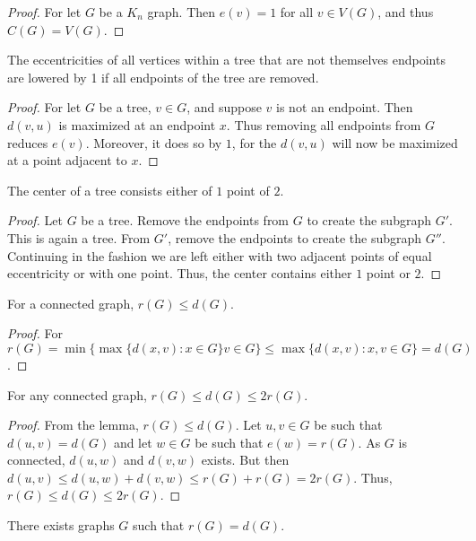 \documentclass[crop=false,class=book,oneside]{standalone}
\begin{document}
        \begin{proof}
        For let $G$ be a $K_n$ graph. Then $e(v) = 1$ for all $v\in V(G)$, and thus $C(G) = V(G)$.
        \end{proof}
        \begin{corollary}
        The eccentricities of all vertices within a tree that are not themselves endpoints are lowered by 1 if all endpoints of the tree are removed.
        \end{corollary}
        \begin{proof}
        For let $G$ be a tree, $v\in G$, and suppose $v$ is not an endpoint. Then $d(v,u)$ is maximized at an endpoint $x$. Thus removing all endpoints from $G$ reduces $e(v)$. Moreover, it does so by $1$, for the $d(v,u)$ will now be maximized at a point adjacent to $x$.
        \end{proof}
        \begin{theorem}
        The center of a tree consists either of $1$ point of $2$.
        \end{theorem}
        \begin{proof}
        Let $G$ be a tree. Remove the endpoints from $G$ to create the subgraph $G'$. This is again a tree. From $G'$, remove the endpoints to create the subgraph $G''$. Continuing in the fashion we are left either with two adjacent points of equal eccentricity or with one point. Thus, the center contains either $1$ point or $2$.
        \end{proof}
        \begin{lemma}
        For a connected graph, $r(G) \leq d(G)$.
        \end{lemma}
        \begin{proof}
        For $r(G) = \min\{\max\{d(x,v):x\in G\} v\in G\} \leq \max\{d(x,v):x,v\in G\}=d(G)$.
        \end{proof}
        \begin{theorem}
        For any connected graph, $r(G) \leq d(G) \leq 2r(G)$.
        \end{theorem}
        \begin{proof}
        From the lemma, $r(G) \leq d(G)$. Let $u,v\in G$ be such that $d(u,v)=d(G)$ and let $w\in G$ be such that $e(w) = r(G)$. As $G$ is connected, $d(u,w)$ and $d(v,w)$ exists. But then $d(u,v)\leq d(u,w)+d(v,w) \leq r(G)+r(G)=2r(G)$. Thus, $r(G)\leq d(G)\leq 2r(G)$.
        \end{proof}
        \begin{corollary}
        There exists graphs $G$ such that $r(G) = d(G)$.
        \end{corollary}
\end{document}
